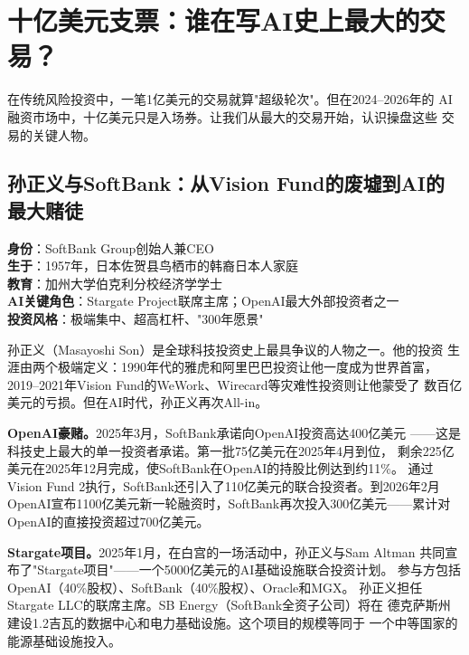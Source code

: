 \section{十亿美元支票：谁在写AI史上最大的交易？}
\label{sec:inv-megarounds}

在传统风险投资中，一笔1亿美元的交易就算"超级轮次"。但在2024--2026年的
AI融资市场中，十亿美元只是入场券。让我们从最大的交易开始，认识操盘这些
交易的关键人物。

\subsection{孙正义与SoftBank：从Vision Fund的废墟到AI的最大赌徒}
\label{subsec:inv-masa}

\begin{corebox}
\textbf{身份}：SoftBank Group创始人兼CEO \\
\textbf{生于}：1957年，日本佐贺县鸟栖市的韩裔日本人家庭 \\
\textbf{教育}：加州大学伯克利分校经济学学士 \\
\textbf{AI关键角色}：Stargate Project联席主席；OpenAI最大外部投资者之一 \\
\textbf{投资风格}：极端集中、超高杠杆、"300年愿景"
\end{corebox}

孙正义（Masayoshi Son）是全球科技投资史上最具争议的人物之一。他的投资
生涯由两个极端定义：1990年代的雅虎和阿里巴巴投资让他一度成为世界首富，
2019--2021年Vision Fund的WeWork、Wirecard等灾难性投资则让他蒙受了
数百亿美元的亏损。但在AI时代，孙正义再次All-in。

\textbf{OpenAI豪赌。}2025年3月，SoftBank承诺向OpenAI投资高达400亿美元
——这是科技史上最大的单一投资者承诺。第一批75亿美元在2025年4月到位，
剩余225亿美元在2025年12月完成，使SoftBank在OpenAI的持股比例达到约11\%。
通过Vision Fund 2执行，SoftBank还引入了110亿美元的联合投资者。到2026年2月
OpenAI宣布1100亿美元新一轮融资时，SoftBank再次投入300亿美元——累计对
OpenAI的直接投资超过700亿美元。

\textbf{Stargate项目。}2025年1月，在白宫的一场活动中，孙正义与Sam Altman
共同宣布了"Stargate项目"——一个5000亿美元的AI基础设施联合投资计划。
参与方包括OpenAI（40\%股权）、SoftBank（40\%股权）、Oracle和MGX。
孙正义担任Stargate LLC的联席主席。SB Energy（SoftBank全资子公司）将在
德克萨斯州建设1.2吉瓦的数据中心和电力基础设施。这个项目的规模等同于
一个中等国家的能源基础设施投入。

